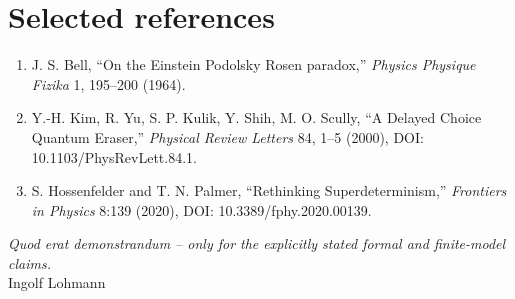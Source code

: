 \documentclass[11pt,a4paper]{article}
\begin{document}
\section*{Selected references}
\begin{enumerate}[leftmargin=*]
\item J. S. Bell, ``On the Einstein Podolsky Rosen paradox,'' \emph{Physics Physique Fizika} 1, 195--200 (1964).
\item Y.-H. Kim, R. Yu, S. P. Kulik, Y. Shih, M. O. Scully, ``A Delayed Choice Quantum Eraser,'' \emph{Physical Review Letters} 84, 1--5 (2000), DOI: 10.1103/PhysRevLett.84.1.
\item S. Hossenfelder and T. N. Palmer, ``Rethinking Superdeterminism,'' \emph{Frontiers in Physics} 8:139 (2020), DOI: 10.3389/fphy.2020.00139.
\end{enumerate}

\vfill
\begin{center}
\textit{Quod erat demonstrandum -- only for the explicitly stated formal and finite-model claims.}\\
Ingolf Lohmann
\end{center}
\end{document}

